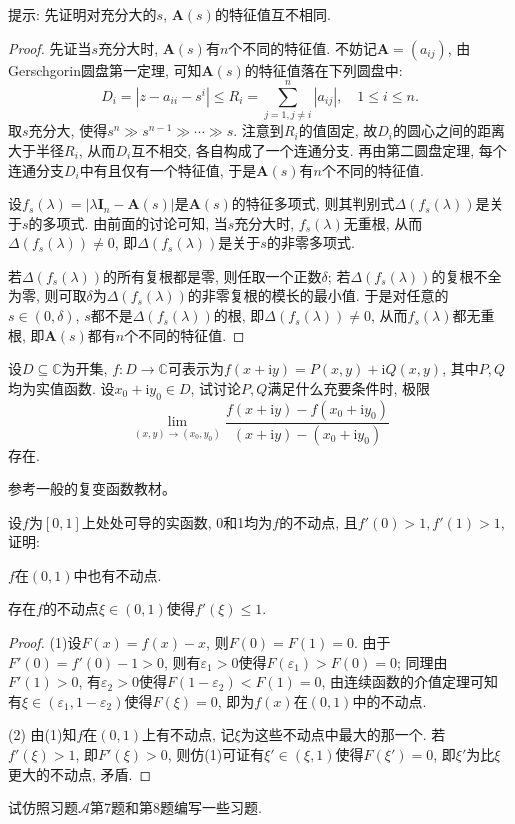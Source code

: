 \begin{quizb}
提示: 先证明对充分大的\(s\), \(\boldsymbol{A}(s)\)的特征值互不相同.
\begin{proof}
先证当\(s\)充分大时, \(\boldsymbol{A}(s)\)有\(n\)个不同的特征值. 不妨记\(\boldsymbol{A}=(a_{ij})\), 由Gerschgorin圆盘第一定理, 可知\(\boldsymbol{A}(s)\)的特征值落在下列圆盘中:\[D_i=\left|z-a_{ii}-s^i\right|\leqslant R_i=\sum_{j=1,j\ne i}^{n}|a_{ij}|,\quad 1\leqslant i\leqslant n.\]取\(s\)充分大, 使得\(s^n\gg s^{n-1}\gg \cdots\gg s\). 注意到\(R_i\)的值固定, 故\(D_i\)的圆心之间的距离大于半径\(R_i\), 从而\(D_i\)互不相交, 各自构成了一个连通分支. 再由第二圆盘定理, 每个连通分支\(D_i\)中有且仅有一个特征值, 于是\(\boldsymbol{A}(s)\)有\(n\)个不同的特征值.

设\(f_s(\lambda)=\left|\lambda\boldsymbol{I}_n-\boldsymbol{A}(s)\right|\)是\(\boldsymbol{A}(s)\)的特征多项式, 则其判别式\(\Delta\left(f_s(\lambda)\right)\)是关于\(s\)的多项式. 由前面的讨论可知, 当\(s\)充分大时, \(f_s(\lambda)\)无重根, 从而\(\Delta\left(f_s(\lambda)\right)\ne 0\), 即\(\Delta\left(f_s(\lambda)\right)\)是关于\(s\)的非零多项式. 

若\(\Delta\left(f_s(\lambda)\right)\)的所有复根都是零, 则任取一个正数\(\delta\); 若\(\Delta\left(f_s(\lambda)\right)\)的复根不全为零, 则可取\(\delta\)为\(\Delta\left(f_s(\lambda)\right)\)的非零复根的模长的最小值. 于是对任意的\(s\in(0,\delta)\), \(s\)都不是\(\Delta\left(f_s(\lambda)\right)\)的根, 即\(\Delta\left(f_s(\lambda)\right)\ne 0\), 从而\(f_s\left(\lambda\right)\)都无重根, 即\(\boldsymbol{A}(s)\)都有\(n\)个不同的特征值.
\end{proof}
\woe 设\(D\subseteq\mathbb{C}\)为开集, \(f:D\rightarrow\mathbb{C}\)可表示为\(f(x+\mathrm{i}y)=P(x,y)+\mathrm{i}Q(x,y)\), 其中\(P,Q\)均为实值函数. 设\(x_0+\mathrm{i}y_0\in D\), 试讨论\(P,Q\)满足什么充要条件时, 极限\[\lim_{(x,y)\rightarrow(x_0,y_0)}\frac{f(x+\mathrm{i}y)-f(x_0+\mathrm{i}y_0)}{(x+\mathrm{i}y)-(x_0+\mathrm{i}y_0)}\]存在.
\begin{solution}
	参考一般的复变函数教材。
\end{solution}
\woe 设\(f\)为\([0,1]\)上处处可导的实函数, 0和1均为\(f\)的不动点, 且\(f'(0)>1,f'(1)>1\), 证明:
\begin{quizs}
\item \(f\)在\((0,1)\)中也有不动点.
\item 存在\(f\)的不动点\(\xi\in(0,1)\)使得\(f'(\xi)\leqslant 1\).
\end{quizs}
\begin{proof}
(1)设\(F(x)=f(x)-x\), 则\(F(0)=F(1)=0\). 由于\(F'(0)=f'(0)-1>0\), 则有\(\varepsilon_1>0\)使得\(F(\varepsilon_1)>F(0)=0\); 同理由\(F'(1)>0\), 有\(\varepsilon_2>0\)使得\(F(1-\varepsilon_2)<F(1)=0\), 由连续函数的介值定理可知有\(\xi\in(\varepsilon_1,1-\varepsilon_2)\)使得\(F(\xi)=0\), 即为\(f(x)\)在\((0,1)\)中的不动点.

(2) 由(1)知\(f\)在\((0,1)\)上有不动点, 记\(\xi\)为这些不动点中最大的那一个. 若\(f'(\xi)>1\), 即\(F'(\xi)>0\), 则仿(1)可证有\(\xi'\in(\xi,1)\)使得\(F(\xi')=0\), 即\(\xi'\)为比\(\xi\)更大的不动点, 矛盾.
\end{proof}
\woe 试仿照习题\(\boldsymbol{\mathcal{A}}\)第7题和第8题编写一些习题.
\end{quizb}
